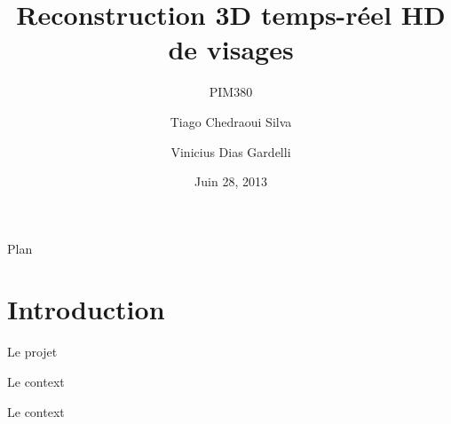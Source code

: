 \documentclass[pdf,11pt,xcolor=dvipsnames]{beamer}
\title{Reconstruction 3D temps-réel HD de visages}
\subtitle{PIM380}
\author[Tiago Siva, Vinicius Gardelli]{
  Tiago Chedraoui Silva \and
  Vinicius Dias Gardelli\\
}
\institute{Télécom Paristech}
\date{Juin 28, 2013}
\begin{document}
\begin{frame}
  \titlepage
\end{frame}

\begin{frame}{Plan}
  \tableofcontents
\end{frame}

\section{Introduction}

\begin{frame}{Le projet}
\end{frame}
\begin{frame}{Le context}
\end{frame}

\begin{frame}{Le context}
\end{frame}

\end{document}
